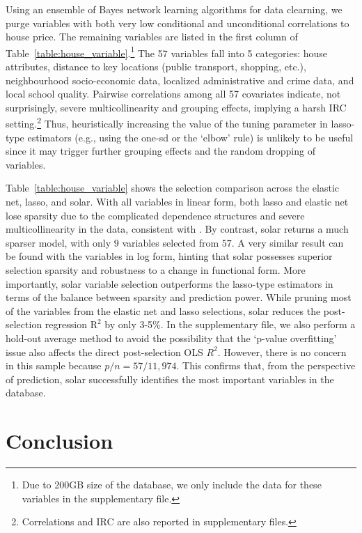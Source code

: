 \documentclass[12pt]{article}
\begin{document}
Using an ensemble of Bayes network learning algorithms for data clearning, we purge variables with both very low conditional and unconditional correlations to house price. The remaining variables are listed in the first column of Table~\ref{table:house_variable}.\footnote{Due to 200GB size of the database, we only include the data for these variables in the supplementary file.} The 57 variables fall into 5 categories: house attributes, distance to key locations (public transport, shopping, etc.), neighbourhood socio-economic data, localized administrative and crime data, and local school quality. Pairwise correlations among all 57 covariates indicate, not surprisingly, severe multicollinearity and grouping effects, implying a harsh IRC setting.\footnote{Correlations and IRC are also reported in supplementary files.} Thus, heuristically increasing the value of the tuning parameter in lasso-type estimators (e.g., using the one-sd or the `elbow' rule) is unlikely to be useful since it may trigger further grouping effects and the random dropping of variables.

Table~\ref{table:house_variable} shows the selection comparison across the elastic net, lasso, and solar. With all variables in linear form, both lasso and elastic net lose sparsity due to the complicated dependence structures and severe multicollinearity in the data, consistent with \citet{jia2010model}. By contrast, solar returns a much sparser model, with only $9$ variables selected from $57$. A very similar result can be found with the variables in log form, hinting that solar possesses superior selection sparsity and robustness to a change in functional form. More importantly, solar variable selection outperforms the lasso-type estimators in terms of the balance between sparsity and prediction power. While pruning most of the variables from the elastic net and lasso selections, solar reduces the post-selection regression $\mathrm{R}^2$ by only 3-5\%. In the supplementary file, we also perform a hold-out average method to avoid the possibility that the `p-value overfitting' issue also affects the direct post-selection OLS $R^2$. However, there is no concern in this sample because $p/n=57/11,974$. This confirms that, from the perspective of prediction, solar successfully identifies the most important variables in the database.


\section{Conclusion}
\end{document}
